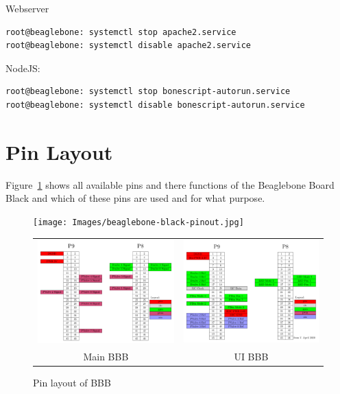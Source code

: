 \documentclass[
	fontsize=10pt
	paper=a4
]{scrartcl}
\begin{document}
Webserver

\begin{lstlisting}[language=bash]
root@beaglebone: systemctl stop apache2.service
root@beaglebone: systemctl disable apache2.service

\end{lstlisting}


NodeJS:


\begin{lstlisting}[language=bash]
root@beaglebone: systemctl stop bonescript-autorun.service
root@beaglebone: systemctl disable bonescript-autorun.service

\end{lstlisting}





\section{Pin Layout}

Figure~\ref{fig:BBBpins} shows all available pins and there functions of the Beaglebone Board Black and which of these pins are used and for what purpose.
\begin{figure}
\begin{center}
\texttt{[image: Images/beaglebone-black-pinout.jpg]} \\
\begin{tabular}{cc}
\includegraphics[width=.45\textwidth]{Images/PinLayout/PinLayoutBBBMain.pdf} &
\includegraphics[width=.45\textwidth]{Images/PinLayout/PinLayoutBBBUI.pdf} \\
Main BBB & UI BBB \\
\end{tabular}
\caption{Pin layout of BBB}
\label{fig:BBBpins}
\end{center}
\end{figure}
\end{document}
